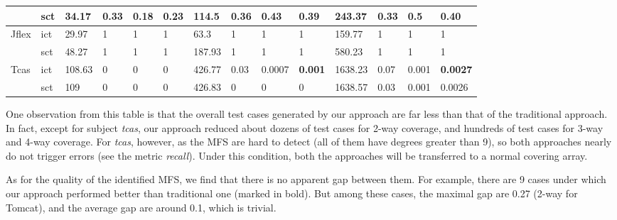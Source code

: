 \documentclass{sig-alternate}
\begin{document}
\begin{table}[htbp]
\begin{tabular}{|ll|llll|llll|llll|}
                         & sct                    & 34.17   & 0.33    & 0.18   & 0.23      & 114.5  & 0.36    & 0.43   & 0.39      & 243.37  & 0.33     & 0.5    & 0.40      \\ \hline
Jflex                    & ict                    & 29.97  & 1       & 1      & 1         & 63.3   & 1       & 1      & 1         & 159.77  & 1       & 1      & 1           \\
                         & sct                    & 48.27  & 1       & 1      & 1         & 187.93 & 1       & 1      & 1         & 580.23  & 1       & 1      & 1           \\ \hline
Tcas                     & ict                    & 108.63 & 0       & 0      & 0         & 426.77 & 0.03    & 0.0007 & \textbf{0.001  }   & 1638.23 & 0.07    & 0.001  &\textbf{ 0.0027 }     \\
                         & sct                    & 109    & 0       & 0      & 0         & 426.83 & 0       & 0      & 0         & 1638.57 & 0.03    & 0.001  & 0.0026 \\ \hline
\end{tabular}
\end{table}

One observation from this table is that the overall test cases generated by our approach are far less than that of the traditional approach. In fact, except for subject \emph{tcas}, our approach reduced about dozens of test cases for 2-way coverage, and hundreds of test cases for 3-way and 4-way coverage. For \emph{tcas}, however, as the MFS are hard to detect (all of them have degrees greater than 9), so both approaches nearly do not trigger errors (see the metric \emph{recall}). Under this condition, both the approaches will be transferred to a normal covering array.

As for the quality of the identified MFS, we find that there is no apparent gap between them. For example, there are 9 cases under which our approach performed better than traditional one (marked in bold). But among these cases, the maximal gap are  0.27 (2-way for Tomcat), and the average gap are around 0.1, which is trivial.
\end{document}

